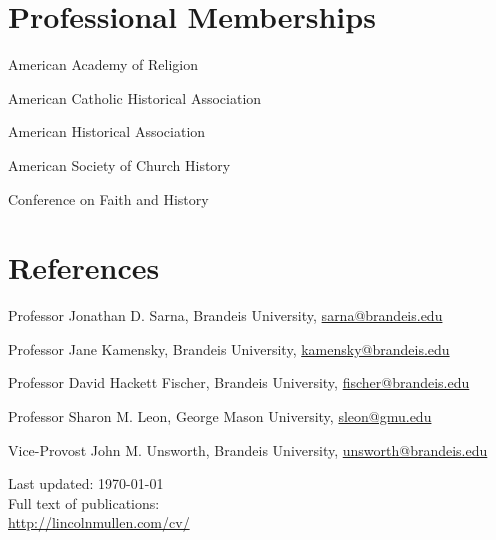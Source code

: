 \documentclass[11pt]{article}
\begin{document}
\section{Professional Memberships}

American Academy of Religion

American Catholic Historical Association

American Historical Association

American Society of Church History

Conference on Faith and History

\section{References}

Professor Jonathan D. Sarna, Brandeis University,
\href{mailto:sarna@brandeis.edu}{sarna@brandeis.edu}

Professor Jane Kamensky, Brandeis University, 
\href{mailto:kamensky@brandeis.edu}{kamensky@brandeis.edu}

Professor David Hackett Fischer, Brandeis University, 
\href{mailto:fischer@brandeis.edu}{fischer@brandeis.edu}

Professor Sharon M. Leon, George Mason University,
\href{mailto:sleon@gmu.edu}{sleon@gmu.edu}

Vice-Provost John M. Unsworth, Brandeis University, 
\href{mailto:unsworth@brandeis.edu}{unsworth@brandeis.edu}

\vfill{}

\begin{center}
  {\scriptsize 
    Last updated: \today\\[.25cm]
    Full text of publications:\\
    \href{http://lincolnmullen.com/cv/}{http://lincolnmullen.com/cv/}\\[.1cm]
  }
\end{center}
\end{document}
